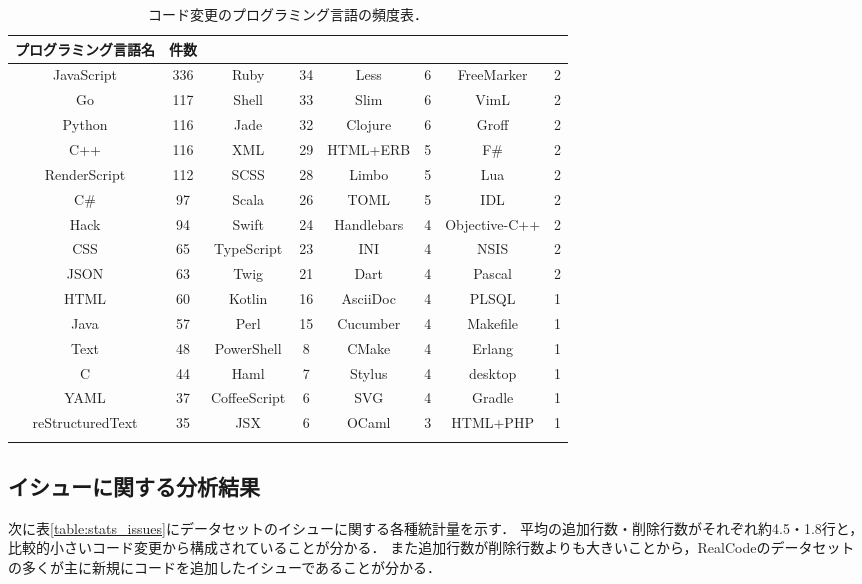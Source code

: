 \begin{table}[!b]
    \small
    \centering
    \caption{コード変更のプログラミング言語の頻度表．} 
    \label{table:issue_lang_freq}
    \begin{tabular}{c | c || c | c || c | c || c | c} \Xhline{3\arrayrulewidth}
        プログラミング言語名 & 件数 &  &  &  &  &  &   \\ \hline \hline
        JavaScript & 336 & Ruby & 34 & Less & 6 & FreeMarker & 2 \\
        Go & 117 & Shell & 33 & Slim & 6 & VimL & 2 \\
        Python & 116 & Jade & 32 & Clojure & 6 & Groff & 2 \\
        C++ & 116 & XML & 29 & HTML+ERB & 5 & F# & 2 \\
        RenderScript & 112 & SCSS & 28 & Limbo & 5 & Lua & 2 \\
        C# & 97 & Scala & 26 & TOML & 5 & IDL & 2 \\
        Hack & 94 & Swift & 24 & Handlebars & 4 & Objective-C++ & 2 \\
        CSS & 65 & TypeScript & 23 & INI & 4 & NSIS & 2 \\
        JSON & 63 & Twig & 21 & Dart & 4 & Pascal & 2 \\
        HTML & 60 & Kotlin & 16 & AsciiDoc & 4 & PLSQL & 1 \\
        Java & 57 & Perl & 15 & Cucumber & 4 & Makefile & 1 \\
        Text & 48 & PowerShell & 8 & CMake & 4 & Erlang & 1 \\
        C & 44 & Haml & 7 & Stylus & 4 & desktop & 1 \\
        YAML & 37 & CoffeeScript & 6 & SVG & 4 & Gradle & 1 \\
        reStructuredText & 35 & JSX & 6 & OCaml & 3 & HTML+PHP & 1 \\

        \Xhline{3\arrayrulewidth}
    \end{tabular}

\end{table}

\subsection{イシューに関する分析結果}

次に表\ref{table:stats_issues}にデータセットのイシューに関する各種統計量を示す．
平均の追加行数・削除行数がそれぞれ約4.5・1.8行と，比較的小さいコード変更から構成されていることが分かる．
また追加行数が削除行数よりも大きいことから，RealCodeのデータセットの多くが主に新規にコードを追加したイシューであることが分かる．

